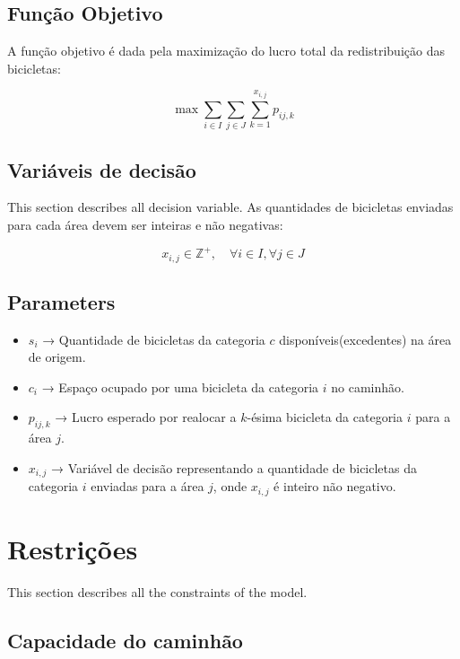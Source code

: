 \documentclass[]{article}
\begin{document}
\subsection{Função Objetivo}

A função objetivo é dada pela maximização do lucro total da redistribuição das bicicletas:

\begin{equation}
\max \sum_{i \in I} \sum_{j \in J} \sum_{k=1}^{x_{i,j}} p_{ij,k}
\end{equation}

\subsection{Variáveis de decisão}
This section describes all decision variable. As quantidades de bicicletas enviadas para cada área devem ser inteiras e não negativas:

\begin{equation}
	x_{i,j} \in \mathbb{Z}^+, \quad \forall i \in I, \forall j \in J
\end{equation}

\subsection{Parameters}

\begin{itemize}
	\item $s_i$ → Quantidade de bicicletas da categoria $c$ disponíveis(excedentes) na área de origem.
	\item $c_i$ → Espaço ocupado por uma bicicleta da categoria $i$ no caminhão.
	\item $p_{ij,k}$ → Lucro esperado por realocar a $k$-ésima bicicleta da categoria $i$ para a área $j$.
	\item $x_{i,j}$ → Variável de decisão representando a quantidade de bicicletas da categoria $i$ enviadas para a área $j$, onde $x_{i,j}$ é inteiro não negativo.
\end{itemize}

\section{Restrições}

This section describes all the constraints of the model.

\subsection{Capacidade do caminhão}
\end{document}
